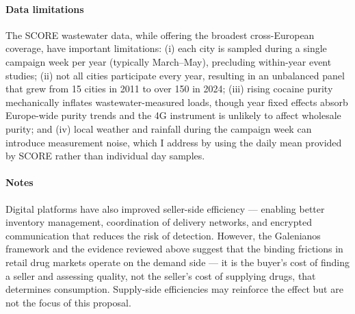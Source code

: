 \documentclass[12pt, a4paper]{article}
\begin{document}
\paragraph{Data limitations} The SCORE wastewater data, while offering the broadest cross-European coverage, have important limitations: (i) each city is sampled during a single campaign week per year (typically March--May), precluding within-year event studies; (ii) not all cities participate every year, resulting in an unbalanced panel that grew from 15 
cities in 2011 to over 150 in 2024; (iii) rising cocaine purity mechanically inflates wastewater-measured loads, though year fixed effects absorb Europe-wide purity trends and the 4G instrument is unlikely to affect wholesale purity; and (iv) local weather and rainfall during the campaign week can introduce measurement noise, which I address by using the daily mean provided by SCORE rather than individual day samples.


\paragraph{Notes}Digital platforms have also improved seller-side 
efficiency --- enabling better inventory management, 
coordination of delivery networks, and encrypted 
communication that reduces the risk of detection. However, 
the Galenianos framework and the evidence reviewed above 
suggest that the binding frictions in retail drug markets 
operate on the demand side --- it is the buyer's cost of 
finding a seller and assessing quality, not the seller's 
cost of supplying drugs, that determines consumption. 
Supply-side efficiencies may reinforce the effect but are 
not the focus of this proposal.
\end{document}
